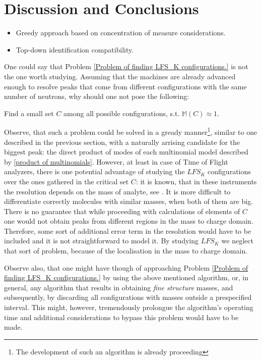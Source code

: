\section{Discussion and Conclusions}


\begin{itemize}
	\item 	Greedy approach based on concentration of measure considerations. 
	\item  	Top-down identification compatibility. 
\end{itemize}


One could say that Problem \ref{Problem of finding LFS_K configurations.} is not the one worth studying. Assuming that the machines are already advanced enough to resolve peaks that come from different configurations with the same number of neutrons, why should one not pose the following:

\begin{Problem}
	Find a small set $C$ among all possible configurations, s.t. $\mathbb{M}(C) \approx 1$.
\end{Problem}

Observe, that such a problem could be solved in a gready manner\footnote{The development of such an algorithm is already proceeding }, similar to one described in the previous section, with a naturally arrising candidate for the biggest peak: the direct product of modes of each multinomial model described by \eqref{product of multinomials}. However, at least in case of Time of Flight analyzers, there is one potential advantage of studying the $LFS_K$ configurations over the ones gathered in the critical set $C$: it is known, that in these instruments the resolution depends on the mass of analyte, see \cite{Eidhammer2008ComputationalMethodsInMassSpectrometry}. It is more difficult to differentiate correctly molecules with similar masses, when both of them are big. There is no guarantee that while proceeding with calculations of elements of $C$ one would not obtain peaks from different regions in the mass to charge domain. Therefore, some sort of additional error term in the resolution would have to be included and it is not straightforward to model it. By studying $LFS_K$ we neglect that sort of problem, because of the localisation in the mass to charge domain.

Observe also, that one might have though of approaching Problem \ref{Problem of finding LFS_K configurations.} by using the above mentioned algorithm, or, in general, any algorithm that results in obtaining {\it fine structure} masses, and subsequently, by discarding all configurations with masses outside a prespecified interval. This might, however, tremendously prolongue the algorithm's operating time and additional considerations to bypass this problem would have to be made.  